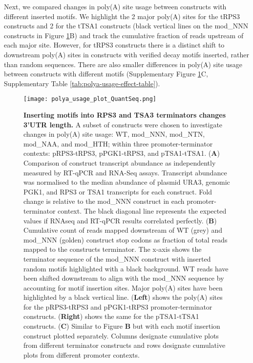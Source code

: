 \documentclass[../main.tex]{subfiles}
\begin{document}
Next, we compared changes in poly(A) site usage between constructs with different inserted motifs.
We highlight the 2 major poly(A) sites for the tRPS3 constructs and 2 for the tTSA1 constructs (black vertical lines on the mod\_NNN constructs in Figure \ref{fig:quantseq-polyA-site-usage}B) and track the cumulative fraction of reads upstream of each major site.
However, for tRPS3 constructs there is a distinct shift to downstream poly(A) sites in constructs with verified decay motifs inserted, rather than random sequences.
There are also smaller differences in poly(A) site usage between constructs with different motifs (Supplementary Figure \ref{fig:quantseq-polyA-site-usage}C, Supplementary Table \ref{tab:polya-usage-effect-table}).

\begin{figure}[p]

{\centering \texttt{[image: polya\_usage\_plot\_QuantSeq.png]} 

}

\caption[Inserting motifs into RPS3 and TSA3 terminators changes 3'UTR length.]{\textbf{Inserting motifs into RPS3 and TSA3 terminators changes 3'UTR length.} A subset of constructs were chosen to investigate changes in poly(A) site usage: WT, mod\_NNN, mod\_NTN, mod\_NAA, and mod\_HTH; within three promoter-terminator contexts: pRPS3-tRPS3, pPGK1-tRPS3, and pTSA1-tTSA1. (\textbf{A}) Comparison of construct transcript abundance as independently measured by  RT-qPCR and RNA-Seq assays. Transcript abundance was normalised to the median abundance of  plasmid URA3, genomic PGK1, and RPS3 or TSA1 transcripts for each construct. Fold change is relative to the mod\_NNN construct in each promoter-terminator context. The black diagonal line represents the expected values if RNAseq and  RT-qPCR results correlated perfectly. (\textbf{B}) Cumulative count of reads mapped downstream of WT (grey) and mod\_NNN (golden) construct stop codons as fraction of total reads mapped to the constructs terminator. The x-axis shows the terminator sequence of the mod\_NNN construct with inserted random motifs highlighted with a black background. WT reads have been shifted downstream to align with the mod\_NNN sequence by accounting for motif insertion sites. Major poly(A) sites have been highlighted by a black vertical line. (\textbf{Left}) shows the poly(A) sites for the pRPS3-tRPS3 and pPGK1-tRPS3 promoter-terminator constructs. (\textbf{Right}) shows the same for the pTSA1-tTSA1 constructs. (\textbf{C}) Similar to Figure \textbf{B} but with each motif insertion construct plotted separately. Columns designate cumulative plots from different terminator constructs and rows designate cumulative plots from different promoter contexts.}\label{fig:quantseq-polyA-site-usage}
\end{figure}
\end{document}
